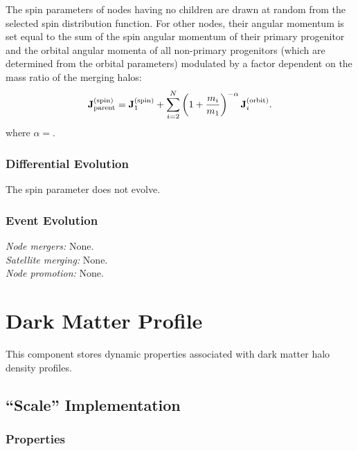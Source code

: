 The spin parameters of nodes having no children are drawn at random from the selected spin distribution function. For other nodes, their angular momentum is set equal to the sum of the spin angular momentum of their primary progenitor and the orbital angular momenta of all non-primary progenitors (which are determined from the orbital parameters) modulated by a factor dependent on the mass ratio of the merging halos:
\begin{equation}
 \mathbf{J}^\mathrm{(spin)}_\mathrm{parent} = \mathbf{J}^\mathrm{(spin)}_{1} + \sum_{i=2}^N \left(1+{m_i \over m_{1}}\right)^{-\alpha} \mathbf{J}^\mathrm{(orbit)}_{i}.
\end{equation}
where $\alpha=${\normalfont \ttfamily [spinVitvitskaMergerRatioExponent]}. 

\subsubsection{Differential Evolution}

The spin parameter does not evolve.

\subsubsection{Event Evolution}

\noindent\emph{Node mergers:} None.\\

\noindent\emph{Satellite merging:} None.\\

\noindent\emph{Node promotion:} None.

\section{Dark Matter Profile}\label{sec:DarkMatterProfileComponent}

This \gls{component} stores dynamic properties associated with dark matter halo density profiles.

\subsection{``Scale'' Implementation}\label{sec:DarkMatterProfileScale}

\subsubsection{Properties}

